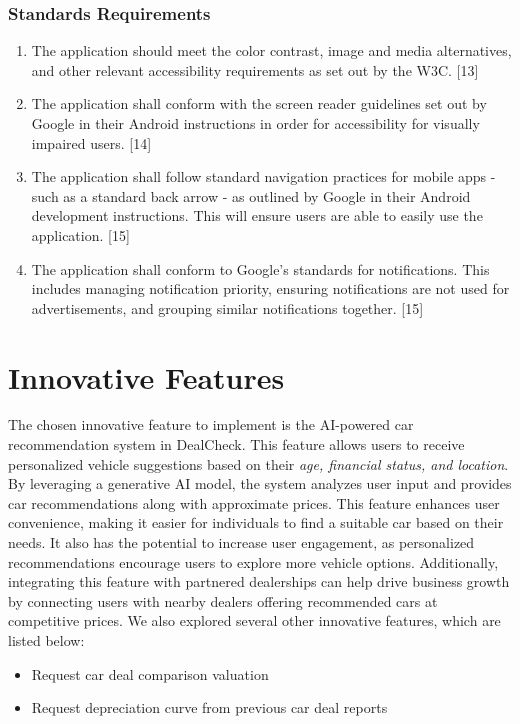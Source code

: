 \documentclass[]{article}
\begin{document}
\subsubsection{Standards Requirements}
\label{ssub:standards_requirements}
\begin{enumerate}[{LR-STD}1. ]
	\item The application should meet the color contrast, image and media alternatives, and other relevant accessibility requirements as set out by the W3C. [13]
	\item The application shall conform with the screen reader guidelines set out by Google in their Android instructions in order for accessibility for visually impaired users. [14]
	\item The application shall follow standard navigation practices for mobile apps - such as a standard back arrow - as outlined by Google in their Android development instructions. This will ensure users are able to easily use the application. [15]
	\item The application shall conform to Google’s standards for notifications. This includes managing notification priority, ensuring notifications are not used for advertisements, and grouping similar notifications together. [15]
\end{enumerate}


\section{Innovative Features}
\label{sec:innovative_features}
The chosen innovative feature to implement is the AI-powered car recommendation system in DealCheck. This feature allows users to receive personalized vehicle suggestions based on their \textit{age, financial status, and location}. By leveraging a generative AI model, the system analyzes user input and provides car recommendations along with approximate prices. This feature enhances user convenience, making it easier for individuals to find a suitable car based on their needs. It also has the potential to increase user engagement, as personalized recommendations encourage users to explore more vehicle options. Additionally, integrating this feature with partnered dealerships can help drive business growth by connecting users with nearby dealers offering recommended cars at competitive prices. We also explored several other innovative features, which are listed below:
\begin{itemize}
    \item Request car deal comparison valuation
    \item Request depreciation curve from previous car deal reports
\end{itemize}
\end{document}
